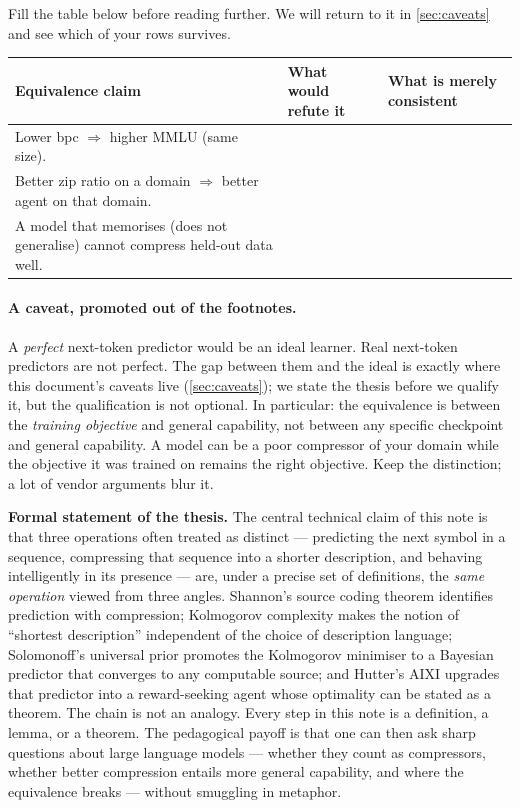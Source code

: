 \documentclass[12pt,a4paper]{article}
\theoremstyle{plain}
\theoremstyle{definition}
\begin{document}
\begin{activity}[title={Activity A4 --- Falsification worksheet}]
Fill the table below before reading further. We will return to it
in \cref{sec:caveats} and see which of your rows survives.
\smallskip

\begin{tabular}{p{4.2cm}p{4.2cm}p{4.2cm}}
\toprule
\textbf{Equivalence claim} & \textbf{What would refute it} & \textbf{What is merely consistent} \\
\midrule
Lower bpc $\Rightarrow$ higher MMLU (same size). & & \\
Better zip ratio on a domain $\Rightarrow$ better agent on that domain. & & \\
A model that memorises (does not generalise) cannot compress held-out data well. & & \\
\bottomrule
\end{tabular}
\end{activity}

\paragraph{A caveat, promoted out of the footnotes.}
A \emph{perfect} next-token predictor would be an ideal learner.
Real next-token predictors are not perfect. The gap between them
and the ideal is exactly where this document's caveats live
(\cref{sec:caveats}); we state the thesis before we qualify it,
but the qualification is not optional. In particular: the
equivalence is between the \emph{training objective} and general
capability, not between any specific checkpoint and general
capability. A model can be a poor compressor of your domain while
the objective it was trained on remains the right objective. Keep
the distinction; a lot of vendor arguments blur it.

\medskip
\noindent\textbf{Formal statement of the thesis.}
The central technical claim of this note is that three operations
often treated as distinct --- predicting the next symbol in a
sequence, compressing that sequence into a shorter description, and
behaving intelligently in its presence --- are, under a precise set
of definitions, the \emph{same operation} viewed from three angles.
Shannon's source coding theorem \citep{shannon1948mathematical}
identifies prediction with compression; Kolmogorov complexity
\citep{kolmogorov1965three} makes the notion of ``shortest
description'' independent of the choice of description language;
Solomonoff's universal prior \citep{solomonoff1964formal} promotes
the Kolmogorov minimiser to a Bayesian predictor that converges to
any computable source; and Hutter's AIXI
\citep{hutter2005universal} upgrades that predictor into a
reward-seeking agent whose optimality can be stated as a theorem.
The chain is not an analogy. Every step in this note is a
definition, a lemma, or a theorem. The pedagogical payoff is that
one can then ask sharp questions about large language models ---
whether they count as compressors, whether better compression
entails more general capability, and where the equivalence breaks
--- without smuggling in metaphor.
\end{document}
